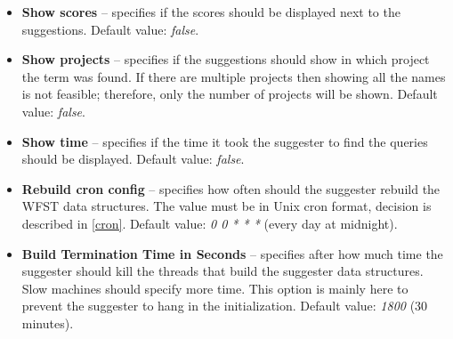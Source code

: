 \begin{itemize}
    \item \textbf{Show scores} – specifies if the scores should be displayed next to the suggestions.
    Default value: \textit{false}.
    \item \textbf{Show projects} – specifies if the suggestions should show in which project the term was found.
    If there are multiple projects then showing all the names is not feasible; therefore, only the number of projects will be shown.
    Default value: \textit{false}.
    \item \textbf{Show time} – specifies if the time it took the suggester to find the queries should be displayed.
    Default value: \textit{false}.
    \item \textbf{Rebuild cron config} – specifies how often should the suggester rebuild the WFST data structures.
    The value must be in Unix cron format, decision is described in \ref{cron}.  Default value: \textit{0 0 * * *} (every day at midnight).
    \item \textbf{Build Termination Time in Seconds} – specifies after how much time the suggester should kill the
    threads that build the suggester data structures. Slow machines should specify more time. This option is mainly here
    to prevent the suggester to hang in the initialization. Default value: \textit{1800} (30 minutes).
\end{itemize}
